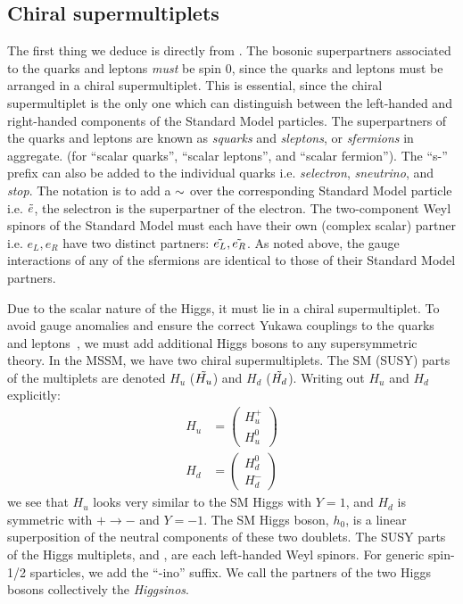 \subsection{Chiral supermultiplets}

The first thing we deduce is directly from .
The bosonic superpartners associated to the quarks and leptons \textit{must} be spin 0, since the quarks and leptons must be arranged in a chiral supermultiplet.
This is essential, since the chiral supermultiplet is the only one which can distinguish between the left-handed and right-handed components of the Standard Model particles.
The superpartners of the quarks and leptons are known as \textit{squarks} and \textit{sleptons}, or \textit{sfermions} in aggregate. (for ``scalar quarks'', ``scalar leptons'', and ``scalar fermion'').
The ``s-'' prefix can also be added to the individual quarks i.e. \textit{selectron}, \textit{sneutrino}, and \textit{stop}.
The notation is to add a $\sim$ over the corresponding Standard Model particle i.e. $\tilde{e}$, the selectron is the superpartner of the electron.
The two-component Weyl spinors of the Standard Model must each have their own (complex scalar) partner i.e. $e_L, e_R$ have two distinct partners: $\tilde{e_L} ,\tilde{e_R}$.
As noted above, the gauge interactions of any of the sfermions are identical to those of their Standard Model partners.

Due to the scalar nature of the Higgs, it must lie in a chiral supermultiplet.
To avoid gauge anomalies and ensure the correct Yukawa couplings to the quarks and leptons~\cite{susyPrimer}, we must add additional Higgs bosons to any supersymmetric theory.
In the MSSM, we have two chiral supermultiplets.
The SM (SUSY) parts of the multiplets are denoted $H_u$ ($\tilde{H_u}$) and $H_d$ ($\tilde{H_d}$).
Writing out $H_u$ and $H_d$ explicitly:
\begin{align}
H_u &= \begin{pmatrix} H_u^+ \\ H_u^0 \end{pmatrix}\\
H_d &= \begin{pmatrix} H_d^0 \\ H_d^- \end{pmatrix}
\end{align}
we see that $H_u$ looks very similar to the SM Higgs with $Y = 1$, and $H_d$ is symmetric with $+ \rightarrow -$ and $ Y = -1$.
The SM Higgs boson, $h_0$, is a linear superposition of the neutral components of these two doublets.
The SUSY parts of the Higgs multiplets,  and , are each left-handed Weyl spinors.
For generic spin-1/2 sparticles, we add the ``-ino'' suffix.
We call the partners of the two Higgs bosons collectively the \textit{Higgsinos}.

